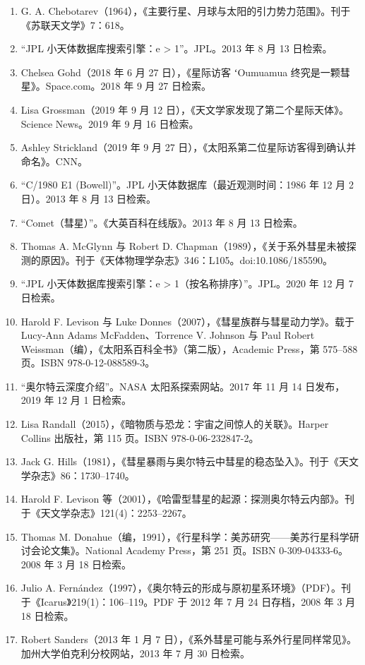 \begin{enumerate}
\item G. A. Chebotarev（1964），《主要行星、月球与太阳的引力势力范围》。刊于《苏联天文学》7：618。
\item “JPL 小天体数据库搜索引擎：e > 1”。JPL。2013 年 8 月 13 日检索。
\item Chelsea Gohd（2018 年 6 月 27 日），《星际访客 ʻOumuamua 终究是一颗彗星》。Space.com。2018 年 9 月 27 日检索。
\item Lisa Grossman（2019 年 9 月 12 日），《天文学家发现了第二个星际天体》。Science News。2019 年 9 月 16 日检索。
\item Ashley Strickland（2019 年 9 月 27 日），《太阳系第二位星际访客得到确认并命名》。CNN。
\item “C/1980 E1 (Bowell)”。JPL 小天体数据库（最近观测时间：1986 年 12 月 2 日）。2013 年 8 月 13 日检索。
\item “Comet（彗星）”。《大英百科在线版》。2013 年 8 月 13 日检索。
\item Thomas A. McGlynn 与 Robert D. Chapman（1989），《关于系外彗星未被探测的原因》。刊于《天体物理学杂志》346：L105。doi:10.1086/185590。
\item “JPL 小天体数据库搜索引擎：e > 1（按名称排序）”。JPL。2020 年 12 月 7 日检索。
\item Harold F. Levison 与 Luke Donnes（2007），《彗星族群与彗星动力学》。载于 Lucy-Ann Adams McFadden、Torrence V. Johnson 与 Paul Robert Weissman（编），《太阳系百科全书》（第二版），Academic Press，第 575–588 页。ISBN 978-0-12-088589-3。
\item “奥尔特云深度介绍”。NASA 太阳系探索网站。2017 年 11 月 14 日发布，2019 年 12 月 1 日检索。
\item Lisa Randall（2015），《暗物质与恐龙：宇宙之间惊人的关联》。Harper Collins 出版社，第 115 页。ISBN 978-0-06-232847-2。
\item Jack G. Hills（1981），《彗星暴雨与奥尔特云中彗星的稳态坠入》。刊于《天文学杂志》86：1730–1740。
\item Harold F. Levison 等（2001），《哈雷型彗星的起源：探测奥尔特云内部》。刊于《天文学杂志》121(4)：2253–2267。
\item Thomas M. Donahue（编，1991），《行星科学：美苏研究——美苏行星科学研讨会论文集》。National Academy Press，第 251 页。ISBN 0-309-04333-6。2008 年 3 月 18 日检索。
\item Julio A. Fernández（1997），《奥尔特云的形成与原初星系环境》（PDF）。刊于《Icarus》219(1)：106–119。PDF 于 2012 年 7 月 24 日存档，2008 年 3 月 18 日检索。
\item Robert Sanders（2013 年 1 月 7 日），《系外彗星可能与系外行星同样常见》。加州大学伯克利分校网站，2013 年 7 月 30 日检索。

\end{enumerate}
